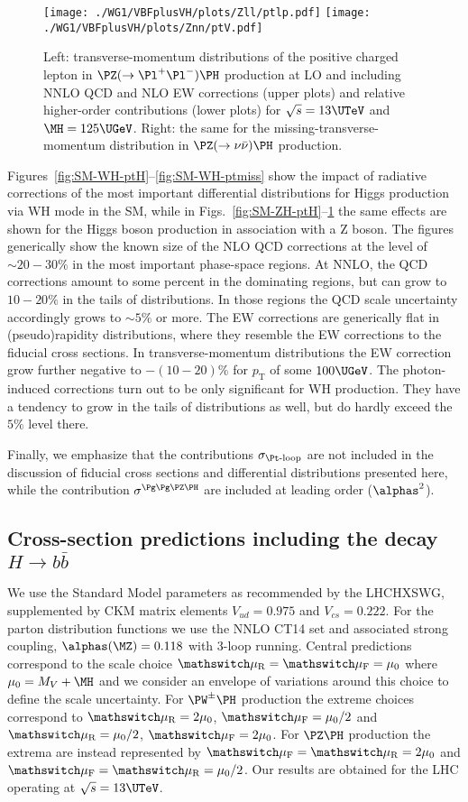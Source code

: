 %
\begin{figure}
\texttt{[image: ./WG1/VBFplusVH/plots/Zll/ptlp.pdf]}
\hfill
\texttt{[image: ./WG1/VBFplusVH/plots/Znn/ptV.pdf]}
\caption{Left: transverse-momentum distributions of the positive charged lepton in $\PZ(\rightarrow \Pl^+\Pl^-)\PH$
production at LO and including NNLO QCD and NLO EW corrections (upper plots)
and relative higher-order contributions (lower plots) for $\sqrt{s}=13\UTeV$ and $\MH=125\UGeV$.
Right: the same for the missing-transverse-momentum distribution in $\PZ(\rightarrow \nu \bar\nu)\PH$ production.}
\label{fig:SM-ZH-ptlpmiss}
\end{figure}
%
Figures~\ref{fig:SM-WH-ptH}--\ref{fig:SM-WH-ptmiss} show the impact of radiative corrections
of the most important differential distributions for Higgs production via WH mode in the SM,
while in Figs.~\ref{fig:SM-ZH-ptH}--\ref{fig:SM-ZH-ptlpmiss} the same effects are shown for
the Higgs boson production in association with a Z boson.
The figures generically show the known size of the NLO QCD corrections at the
level of $\sim20{-}30\%$ in the most important phase-space regions.
At NNLO, the QCD corrections amount to some percent in the dominating regions, but
can grow to $10{-}20\%$ in the tails of distributions. 
In those regions the QCD scale uncertainty accordingly grows to $\sim5\%$ or more.
The EW corrections are generically flat in (pseudo)rapidity distributions,
where they resemble the EW corrections to the fiducial cross sections.
In transverse-momentum distributions the EW correction grow further negative
to $-(10{-}20)\%$ for $p_{\mathrm{T}}$ of some $100\UGeV$.
The photon-induced corrections turn out to be only significant for WH
production. They have a tendency to grow in the tails of distributions as well,
but do hardly exceed the $5\%$ level there.

Finally, we emphasize that the contributions $\sigma_{\Pt\mbox{\scriptsize -loop}}$ are not
included in the discussion of fiducial cross sections and differential distributions
presented here, while the contribution $\sigma^{\Pg\Pg\PZ\PH}$ are included at leading
order ($\alphas^2$).

\subsection{Cross-section predictions including the decay $H\to b\bar b$}

We use the Standard Model parameters as recommended by the LHCHXSWG,
supplemented by CKM matrix elements $V_{ud} = 0.975$ and
$V_{cs} = 0.222$.  For the
parton distribution functions we use the NNLO CT14 set and associated
strong coupling, $\alphas(\MZ)=0.118$ with 3-loop running.  Central
predictions correspond to the scale choice $\muR = \muF = \mu_0$ where
$\mu_0 = M_V + \MH$ and
we consider an envelope of variations around this choice to define
the scale uncertainty.  For $\PW^\pm \PH$ production the extreme choices
correspond to $\muR = 2\mu_0$, $\muF=\mu_0/2$ and
$\muR = \mu_0/2$, $\muF=2\mu_0$.  For $\PZ\PH$ production the extrema
are instead represented by $\muF = \muR = 2\mu_0$ and
$\muF = \muR = \mu_0/2$.  Our results are obtained for the LHC operating
at $\sqrt s=13\UTeV$.

